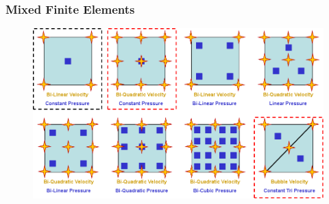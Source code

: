 \documentclass[8pt,xcolor=svgnames]{beamer}
\begin{document}
\begin{frame}
 \frametitle{Mixed Finite Elements}
 \begin{figure}[h!]
  \centering
  \includegraphics[height=0.8\textheight,keepaspectratio=true]{./Images/mixedElements.png}
  \end{figure}
\end{frame}
\end{document}
